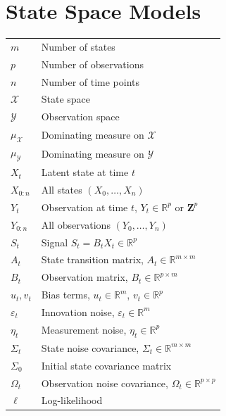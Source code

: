 \section*{State Space Models}
\noindent
\begin{tabular}{@{} p{\symcolwidth} p{\dimexpr\linewidth-\symcolwidth-2\tabcolsep\relax} @{}}
$m$                   & Number of states \\
$p$                   & Number of observations \\
$n$                   & Number of time points \\
$\mathcal{X}$         & State space \\
$\mathcal{Y}$         & Observation space \\
$\mu_{\mathcal X}$    & Dominating measure on $\mathcal{X}$ \\
$\mu_{\mathcal Y}$    & Dominating measure on $\mathcal{Y}$ \\
$X_t$                 & Latent state at time $t$ \\
$X_{0:n}$             & All states $(X_0, \dots, X_n)$ \\
$Y_t$                 & Observation at time $t$, $Y_t \in \mathbb{R}^p$ or $\mathbf{Z}^p$ \\
$Y_{0:n}$             & All observations $(Y_0, \dots, Y_n)$ \\
$S_t$                 & Signal $S_t = B_t X_t \in \mathbb{R}^p$ \\
$A_t$                 & State transition matrix, $A_t \in \mathbb{R}^{m \times m}$ \\
$B_t$                 & Observation matrix, $B_t \in \mathbb{R}^{p \times m}$ \\
$u_t, v_t$            & Bias terms, $u_t \in \mathbb{R}^m$, $v_t \in \mathbb{R}^p$ \\
$\varepsilon_t$       & Innovation noise, $\varepsilon_t \in \mathbb{R}^m$ \\
$\eta_t$              & Measurement noise, $\eta_t \in \mathbb{R}^p$ \\
$\Sigma_t$            & State noise covariance, $\Sigma_t \in \mathbb{R}^{m \times m}$ \\
$\Sigma_0$            & Initial state covariance matrix \\
$\Omega_t$            & Observation noise covariance, $\Omega_t \in \mathbb{R}^{p \times p}$ \\
$\ell$                & Log-likelihood \\
\end{tabular}

